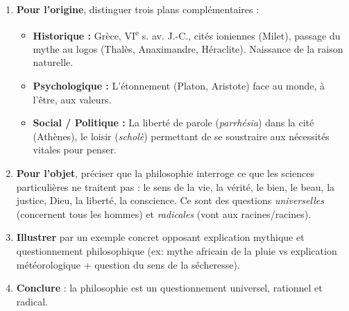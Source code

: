 \documentclass[11pt]{article}
\newcommand{\cle}[1]{{\popxbold\color{popdark}#1}}
\begin{document}
\begin{methode}
\begin{enumerate}
\item \textbf{Pour l'origine}, distinguer trois plans complémentaires :
    \begin{itemize}
    \item \textbf{Historique :} Grèce, VI\textsuperscript{e} s. av. J.-C., cités ioniennes (Milet), passage du \cle{mythe} au \cle{logos} (Thalès, Anaximandre, Héraclite). Naissance de la raison naturelle.
    \item \textbf{Psychologique :} L'\cle{étonnement} (Platon, Aristote) face au monde, à l'être, aux valeurs.
    \item \textbf{Social / Politique :} La \cle{liberté de parole} (\emph{parrhésia}) dans la cité (Athènes), le \cle{loisir} (\emph{scholè}) permettant de se soustraire aux nécessités vitales pour penser.
    \end{itemize}
\item \textbf{Pour l'objet}, préciser que la philosophie interroge ce que les sciences particulières ne traitent pas : le \cle{sens} de la vie, la \cle{vérité}, le \cle{bien}, le \cle{beau}, la \cle{justice}, \cle{Dieu}, la \cle{liberté}, la \cle{conscience}. Ce sont des questions \emph{universelles} (concernent tous les hommes) et \emph{radicales} (vont aux racines/racines).
\item \textbf{Illustrer} par un exemple concret opposant explication mythique et questionnement philosophique (ex: mythe africain de la pluie vs explication météorologique + question du sens de la sécheresse).
\item \textbf{Conclure} : la philosophie est un questionnement universel, rationnel et radical.
\end{enumerate}
\end{methode}
\end{document}
